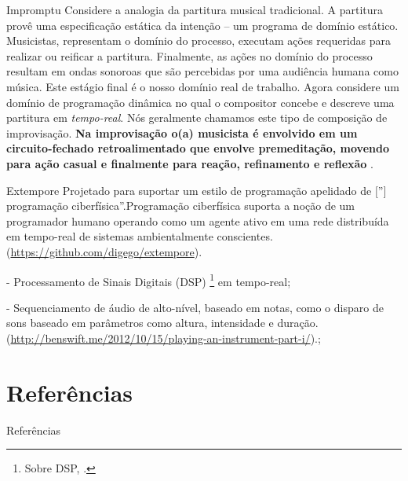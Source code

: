 \documentclass[aspectratio=169]{beamer}
\begin{document}
\begin{frame}{Impromptu}
Considere a analogia da partitura musical tradicional. A partitura provê uma especificação estática da intenção -- um programa de domínio estático. Musicistas, representam o domínio do processo, executam ações requeridas para realizar ou reificar a partitura. Finalmente, as ações no domínio do processo resultam em ondas sonoroas que são percebidas por uma audiência humana como música. Este estágio final é o nosso domínio real de trabalho. Agora considere um domínio de programação dinâmica no qual o compositor concebe e descreve uma partitura em \emph{tempo-real}. Nós geralmente chamamos este tipo de composição de improvisação. \textbf{Na improvisação o(a) musicista é envolvido em um circuito-fechado retroalimentado que envolve premeditação, movendo para ação casual e finalmente para reação, refinamento e reflexão} \cite[p.~823]{sorensen_impromptu_2010}.
\end{frame}

\begin{frame}{Extempore}
Projetado para suportar um estilo de programação apelidado de $[$''$]$programação ciberfísica''.Programação ciberfísica suporta a noção de um programador humano operando como um agente ativo em uma rede distribuída em tempo-real de sistemas ambientalmente conscientes. (\url{https://github.com/digego/extempore}). 

- Processamento de Sinais Digitais (DSP) \footnote{Sobre DSP, .} em  tempo-real;

- Sequenciamento de áudio de alto-nível, baseado em notas, como o disparo de sons baseado em parâmetros como altura, intensidade e duração. (\url{http://benswift.me/2012/10/15/playing-an-instrument-part-i/}).;
\end{frame}




\section*{Referências}


\begin{frame}[allowframebreaks]{Referências}

\end{frame}

\end{document}
